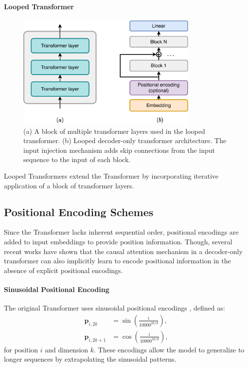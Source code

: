 \paragraph{Looped Transformer}

\begin{figure}[h!]
    \centering
    \includegraphics[width=0.8\textwidth]{fig/looped_transformer.pdf}
    \caption{(a) A block of multiple transformer layers used in the looped transformer. (b) Looped decoder-only transformer architecture. The input injection mechanism adds skip connections from the input sequence to the input of each block.}
    \label{fig:looped_transformer}
\end{figure}

Looped Transformers \parencite{yang_looped_2023} extend the Transformer by incorporating iterative application of a block of transformer layers.

\subsection{Positional Encoding Schemes}\label{subsec:positional_encoding}

Since the Transformer lacks inherent sequential order, positional encodings are added to input embeddings to provide position information. Though, several recent works have shown that the causal attention mechanism in a decoder-only transformer can also implicitly learn to encode positional information \parencite{zuo_breaking_2024,zhou_transformers_2024} in the absence of explicit positional encodings.

\paragraph{Sinusoidal Positional Encoding}\label{subsec:sinusoidal_pos_enc}

The original Transformer uses sinusoidal positional encodings \cite{vaswani_attention_2017}, defined as:
\begin{align*}
    \mathbf{p}_{i,2k}   & = \sin\left( \frac{i}{10000^{2k/d}} \right), \\
    \mathbf{p}_{i,2k+1} & = \cos\left( \frac{i}{10000^{2k/d}} \right),
\end{align*}
for position $i$ and dimension $k$. These encodings allow the model to generalize to longer sequences by extrapolating the sinusoidal patterns.

